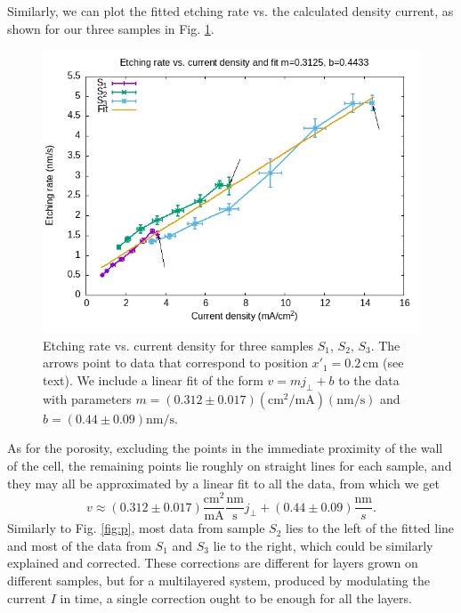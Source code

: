 \documentclass[review,sort&compress]{cas-sc}
\begin{document}
Similarly, we can plot the fitted etching rate vs.
the calculated density current, as shown for our three
samples in Fig. \ref{fig:v}.
\begin{figure}
  \centering
  \includegraphics[width=\textwidth]{fig12}
  \caption{Etching rate vs. current density for three samples
    $S_1$, $S_2$, $S_3$. The arrows point to data that correspond to
    position $x'_1=0.2\,\text{cm}$ (see text). We include a linear fit of the form
    $v=mj_\perp+b$ to the data with parameters $m=(0.312\pm
    0.017)(\text{cm}^2/\text{mA})(\text{nm/s})$ and
    $b=(0.44\pm0.09)\text{nm/s}$. }
  \label{fig:v}
\end{figure}
As for the porosity, excluding the points in the
immediate proximity of the wall of the cell, the remaining points
lie roughly on straight lines for each sample, and they
may all be approximated by a linear fit to all the data, from which we get
\begin{equation}\label{eq:v}
  v\approx (0.312\pm0.017)\frac{\text{cm}^2}{\text{mA}}
  \frac{\text{nm}}{\text{s}}j_\perp +
  (0.44\pm0.09)\frac{\text{nm}}{{s}}.
\end{equation}
Similarly to
Fig. \ref{fig:p}, most data from sample $S_2$ lies to the left of the
fitted line and most of the data from $S_1$ and $S_3$  lie to the
right, which could be similarly explained and corrected.
These corrections are different for layers grown on different samples,
but for a multilayered system, produced by modulating the current $I$ in
time, a single correction ought to be enough for all the layers.
\end{document}
